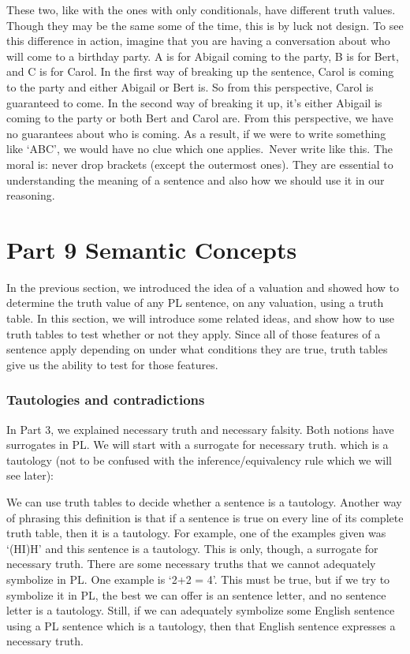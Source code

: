 These two, like with the ones with only conditionals, have different truth values. Though they may be the same some of the time, this is by luck not design. To see this difference in action, imagine that you are having a conversation about who will come to a birthday party. A is for Abigail coming to the party, B is for Bert, and C is for Carol. In the first way of breaking up the sentence, Carol is coming to the party and either Abigail or Bert is. So from this perspective, Carol is guaranteed to come. In the second way of breaking it up, it's either Abigail is coming to the party or both Bert and Carol are. From this perspective, we have no guarantees about who is coming. As a result, if we were to write something like `A\eor B\eand C', we would have no clue which one applies. Never write like this. The moral is: never drop brackets (except the outermost ones). They are essential to understanding the meaning of a sentence and also how we should use it in our reasoning. 
\chapter{Part 9 Semantic Concepts}
In the previous section, we introduced the idea of a valuation and showed how to determine the truth value of any PL sentence, on any valuation, using a truth table. In this section, we will introduce some related ideas, and show how to use truth tables to test whether or not they apply. Since all of those features of a sentence apply depending on under what conditions they are true, truth tables give us the ability to test for those features. 

\subsection{Tautologies and contradictions}

In Part 3, we explained necessary truth and necessary falsity. Both notions have surrogates in PL. We will start with a surrogate for necessary truth. which is a \gls{tautology} (not to be confused with the inference/equivalency rule which we will see later):


We can use truth tables to decide whether a sentence is a tautology. Another way of phrasing this definition is that if a sentence is true on every line of its complete truth table, then it is a tautology. For example, one of the examples given was ‘(H\eand I)\eif H’ and this sentence is a tautology. This is only, though, a surrogate for necessary truth. There are some necessary truths that we cannot adequately symbolize in PL. One example is ‘2+2 = 4’. This must be true, but if we try to symbolize it in PL, the best we can offer is an sentence letter, and no sentence letter is a tautology. Still, if we can adequately symbolize some English sentence using a PL sentence which is a tautology, then that English sentence expresses a necessary truth.

